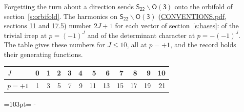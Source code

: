 \documentclass[10pt,a4paper]{article}
\newcommand{\needspace}[1]{\par\penalty-100\begingroup\dimen0=#1\relax\dimen2=\pagegoal
  \advance\dimen2-\pagetotal\ifdim\dimen0>\dimen2\relax\ifdim\dimen2>0pt\vfil\break\fi\fi
  \endgroup}
\numberwithin{equation}{section}
\newcommand{\grp}[1]{\mathsf{#1}}
\begin{document}
Forgetting the turn about a direction sends $\grp{S_{22}}\backslash\grp{O(3)}$ onto the orbifold of section~\ref{s:orbifold}.
The harmonics on $\grp{S_{22}}\backslash\grp{O(3)}$ (\href{../../CONVENTIONS.pdf}{CONVENTIONS.pdf}, sections \href{../../CONVENTIONS.pdf\#conv.11}{11} and \href{../../CONVENTIONS.pdf\#conv.17.5}{17.5}) number $2J + 1$ for each vector of section~\ref{s:bases}: of the trivial irrep at $p = (-1)^J$ and of the determinant character at $p = -(-1)^J$. The table gives these numbers for $J \le 10$, all at $p = +1$, and the record holds their generating functions.
{\small\setlength{\tabcolsep}{4pt}\begin{longtable}{@{}lrrrrrrrrrrr@{}}\toprule
$J$ & 0 & 1 & 2 & 3 & 4 & 5 & 6 & 7 & 8 & 9 & 10\\\midrule\endhead
\bottomrule\endfoot\endlastfoot
$p = +1$ & 1 & 3 & 5 & 7 & 9 & 11 & 13 & 15 & 17 & 19 & 21\\
\bottomrule\end{longtable}}
\needspace{103pt}
\end{document}
